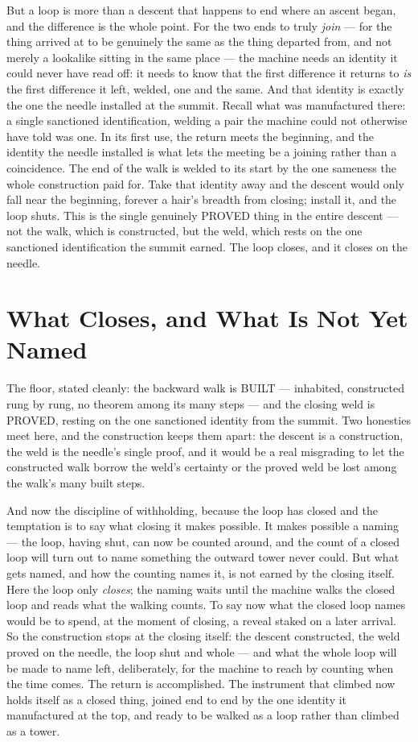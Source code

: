 But a loop is more than a descent that happens to end where an ascent began, and the difference is the whole
point. For the two ends to truly \emph{join} --- for the thing arrived at to be genuinely the same as the thing
departed from, and not merely a lookalike sitting in the same place --- the machine needs an identity it could
never have read off: it needs to know that the first difference it returns to \emph{is} the first difference it
left, welded, one and the same. And that identity is exactly the one the needle installed at the summit. Recall
what was manufactured there: a single sanctioned identification, welding a pair the machine could not otherwise
have told was one. In its first use, the return meets the beginning, and the
identity the needle installed is what lets the meeting be a joining rather than a coincidence. The end of the walk
is welded to its start by the one sameness the whole construction paid for. Take that identity away and the
descent would only fall near the beginning, forever a hair's breadth from closing; install it, and the loop shuts.
This is the single genuinely PROVED thing in the entire descent --- not the walk, which is constructed, but the
weld, which rests on the one sanctioned identification the summit earned. The loop closes, and it closes on the
needle.

\section{What Closes, and What Is Not Yet Named}

The floor, stated cleanly: the backward walk is BUILT --- inhabited, constructed rung by rung, no theorem among
its many steps --- and the closing weld is PROVED, resting on the one sanctioned identity from the summit. Two
honesties meet here, and the construction keeps them apart: the descent is a construction, the weld is the needle's
single proof, and it would be a real misgrading to let the constructed walk borrow the weld's certainty or the
proved weld be lost among the walk's many built steps.

And now the discipline of withholding, because the loop has closed and the temptation is to say what closing it
makes possible. It makes possible a naming --- the loop, having shut, can now be counted around, and the count of
a closed loop will turn out to name something the outward tower never could. But what gets named, and how the
counting names it, is not earned by the closing itself. Here the loop only \emph{closes}; the naming waits until
the machine walks the closed loop and reads what the walking counts. To say now what the closed loop names would
be to spend, at the moment of closing, a reveal staked on a later arrival. So the construction stops at the
closing itself: the descent constructed, the weld proved on the needle, the loop shut and whole --- and what the
whole loop will be made to name left, deliberately, for the machine to reach by counting when the time comes. The
return is accomplished. The instrument that climbed now holds itself as a
closed thing, joined end to end by the one identity it manufactured at the top, and ready to be walked as a loop
rather than climbed as a tower.
